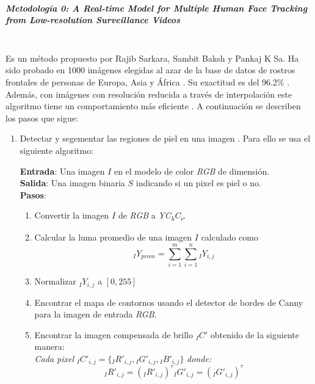 \documentclass[a4paper,openright,12pt]{report}
\begin{document}
\subparagraph{Metodología 0: A Real-time Model for Multiple Human Face Tracking
              from Low-resolution Surveillance Videos}\mbox{} \\

Es un método propuesto por Rajib Sarkara, Sambit Baksh y Pankaj K Sa. Ha sido
probado en 1000 imágenes elegidas al azar de la base de datos de rostros
frontales de personas de Europa, Asia y África \cite{sarkar2012real}.
Su exactitud es del 96.2\% \cite{sarkar2012real}.
Además, con imágenes con resolución reducida a través de interpolación este
algoritmo tiene un comportamiento más eficiente \cite{sarkar2012real}.
A continuación se describen los pasos que sigue:
\begin{enumerate}[label=(\alph*)]
    \item Detectar y segementar las regiones de piel en una imagen
        \cite{sarkar2012real}. Para ello se usa el siguiente algoritmo:
    \begin{framed}
    \textbf{Entrada}: Una imagen $I$ en el modelo de color \textit{RGB} de
    dimensión.\\
    \textbf{Salida}: Una imagen binaria $S$ indicando si un pixel es piel o no.\\
    \textbf{Pasos}:\\
        \begin{enumerate}[label=\arabic*.]
            \item Convertir la imagen $I$ de \textit{RGB} a
                \textit{YC\textsubscript{b}C\textsubscript{r}}.
            \item Calcular la luma promedio de una imagen $I$ calculado como
                \[
                    {}_{I}Y_{prom} = {\sum_{i=1}^{m}\sum_{i=1}^{n} {}_{I}Y_{i,j}} 
                \]
            \item Normalizar ${}_{I}Y_{i,j}$ a ${[0,255]}$
            \item Encontrar el mapa de contornos usando el detector de bordes de
                Canny para la imagen de entrada \textit{RGB}.
            \item Encontrar la imagen compensada de brillo ${}_{I}C'$ obtenido
                de la siguiente manera:\\
                \textit{Cada pixel}
                    ${}_{I}C'_{i,j} = \{{}_{I}R'_{i,j}, {}_{I}G'_{i,j}, {}_{I}B'_{i,j}\}$
                \textit{donde:}\\
                \[
                    {}_{I}R'_{i,j} = ({}_{I}R'_{i,j})^\tau
                    {}_{I}G'_{i,j} = ({}_{I}G'_{i,j})^\tau
\]
\end{enumerate}
\end{framed}
\end{enumerate}
\end{document}
